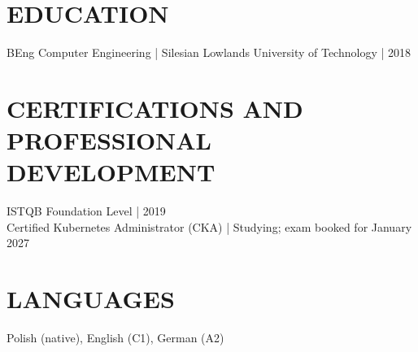 \documentclass[11pt,a4paper]{article}
\begin{document}
\section*{EDUCATION}
BEng Computer Engineering | Silesian Lowlands University of Technology | 2018

\section*{CERTIFICATIONS AND PROFESSIONAL DEVELOPMENT}
ISTQB Foundation Level | 2019\\
Certified Kubernetes Administrator (CKA) | Studying; exam booked for January 2027

\section*{LANGUAGES}
Polish (native), English (C1), German (A2)
\end{document}
